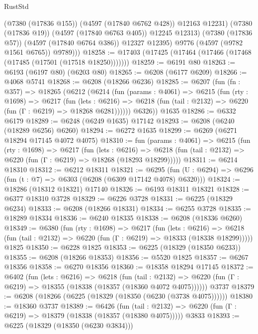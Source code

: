 \begin{lexlean}{RustStd}
\begin{coremodule}
                (@7380 (@17836 @155))
                (@4597 (@17840 @6762 @428))
                @12163
                @12231)
              (@7380 (@17836 @19))
              (@4597 (@17840 @6763 @405))
              @12245
              @12313)
            (@7380 (@17836 @57))
            (@4597 (@17840 @6764 @386))
            @12327
            @12395)
          @9776
          (@4597 (@9782 @1561 @6765))
          @9789)))
@18258 := @17403 (@17425 (@17464 (@17466 (@17468 (@17485 (@17501 (@17518 @18250)))))))
@18259 := @6191 @80
@18263 := @6193 (@6197 @80) (@6203 @80)
@18265 := @6208 (@6177 @6209)
@18266 := @4068 @5741
@18268 := @6208 (@18266 @6236)
@18285 := @6207
    (fun (fn : @357) =>
    @18265
      (@6212
        (@6214
          (fun (params : @4061) =>
          @6215
            (fun (rty : @1698) =>
            @6217
              (fun (lets : @6216) =>
              @6218 (fun (tail : @2132) => @6220 (fun (Γ : @6219) => @18268 @6281))))))
        @6326))
    @1635
@18286 := @6332 @6179
@18289 := @6248 (@6249 @1635) @17142
@18293 := @6208 (@6240 (@18289 @6256) @6260)
@18294 := @6272 @1635
@18299 := @6269 (@6271 @18294 @17145 @4072 @4075)
@18310 := fun (params : @4061) =>
  @6215
    (fun (rty : @1698) =>
    @6217
      (fun (lets : @6216) =>
      @6218 (fun (tail : @2132) => @6220 (fun (Γ : @6219) => @18268 (@18293 @18299)))))
@18311 := @6214 @18310
@18312 := @6212 @18311
@18321 := @6295
    (fun (U : @6294) => @6296 (fun (t : @7) => @6303 (@6208 (@6309 @17142 @4078) @6320)))
@18324 := @18286 (@18312 @18321) @17140
@18326 := @6193 @18311 @18321
@18328 := @6377 @18310 @3728
@18329 := @6226 @3728
@18331 := @6225 (@18329 @6234)
@18333 := @6208 (@18266 @18331)
@18334 := @6255 @3728
@18335 := @18289 @18334
@18336 := @6240 @18335
@18338 := @6208 (@18336 @6260)
@18349 := @6380
    (fun (rty : @1698) =>
    @6217
      (fun (lets : @6216) =>
      @6218 (fun (tail : @2132) => @6220 (fun (Γ : @6219) => @18333 (@18338 @18299)))))
    @1825
@18350 := @6228 @1825
@18353 := @6225 (@18329 (@18350 @6233))
@18355 := @6208 (@18266 @18353)
@18356 := @5520 @1825
@18357 := @6267 @18356
@18358 := @6270 @18356
@18360 := @18358 @18294 @17145
@18372 := @6402
    (fun (lets : @6216) =>
    @6218
      (fun (tail : @2132) =>
      @6220 (fun (Γ : @6219) => @18355 (@18338 (@18357 (@18360 @4072 @4075))))))
    @3737
@18379 := @6208 (@18266 (@6225 (@18329 (@18350 (@6230 (@3738 @4075))))))
@18380 := @18360 @3737
@18389 := @6426
    (fun (tail : @2132) => @6220 (fun (Γ : @6219) => @18379 (@18338 (@18357 (@18380 @4075)))))
    @3833
@18393 := @6225 (@18329 (@18350 (@6230 @3834)))

\end{coremodule}
\end{lexlean}
